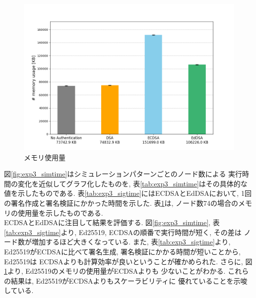 \begin{figure}
  \centering
  \includegraphics[width=1\textwidth]{figures/memory_usages.png}
  \caption{メモリ使用量}
  \label{fig:memory_usages}
\end{figure}

\indent 図\ref{fig:exp3_simtime}はシミュレーションパターンごとのノード数による
実行時間の変化を近似してグラフ化したものを, 表\ref{tab:exp3_simtime}はその具体的な
値を示したものである. 表\ref{tab:exp3_sigtime}にはECDSAとEdDSAにおいて, 
1回の署名作成と署名検証にかかった時間を示した. 表\ref{fig:memory_usages}は, 
ノード数74の場合のメモリの使用量を示したものである. \\
\indent ECDSAとEdDSAに注目して結果を評価する. 図\ref{fig:exp3_simtime}, 
表\ref{tab:exp3_sigtime}より, Ed25519, ECDSAの順番で実行時間が短く, その差は
ノード数が増加するほど大きくなっている. また, 表\ref{tab:exp3_sigtime}より, 
Ed25519がECDSAに比べて署名生成, 署名検証にかかる時間が短いことから, Ed25519は
ECDSAよりも計算効率が良いということが確かめられた. さらに, 
図\ref{fig:memory_usages}より, Ed25519のメモリの使用量がECDSAよりも
少ないことがわかる. これらの結果は, Ed25519がECDSAよりもスケーラビリティに
優れていることを示唆している. 


